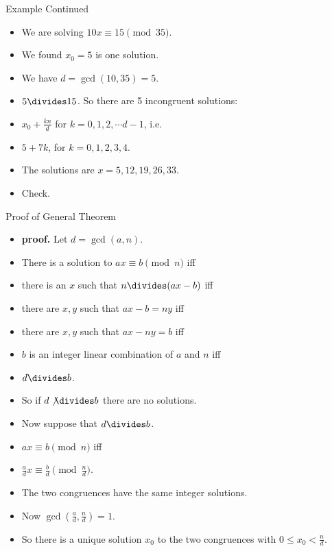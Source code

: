 \documentclass{beamer}
\begin{document}
\begin{frame}{Example Continued}
\begin{itemize}
  \item We are solving $10x \equiv 15 \pmod {35}$.
  \item We found $x_0=5$ is one solution.
  \item We have $d=\gcd(10,35) = 5$.
  \item $5\divides 15$. So there are 5 incongruent solutions:
  \item $x_0 + \frac{kn}{d}$ for $k=0,1,2,\cdots d-1$, i.e.
  \item $5 + 7k$, for $k=0,1,2,3,4$.
  \item The solutions are $x=5,12,19,26,33$.
  \item Check.
\end{itemize}
\end{frame}

\begin{frame}{Proof of General Theorem}
\begin{itemize}
  \item \textbf{proof.} Let $d=\gcd(a,n)$.
  \item There is a solution to $ax\equiv b \pmod n$ iff
  \item there is an $x$ such that $n\divides (ax - b)$ iff
  \item there are $x,y$ such that $ax-b = ny$ iff
  \item there are $x,y$ such that $ax - ny = b$ iff
  \item $b$ is an integer linear combination of $a$ and $n$ iff
  \item $d\divides b$.
  \item So if $d\not\divides b$ there are no solutions.
  \item Now suppose that $d\divides b$.
  \item $ax\equiv b \pmod n$ iff
  \item $\frac{a}{d}x \equiv \frac{b}{d} \pmod {\frac{n}{d}}$.
  \item The two congruences have the same integer solutions.
  \item Now $\gcd(\frac{a}{d},\frac{n}{d}) = 1$.
  \item So there is a unique solution $x_0$ to the two congruences with
  $0\leq x_0 < \frac{n}{d}$.
\end{itemize}
\end{frame}
\end{document}
